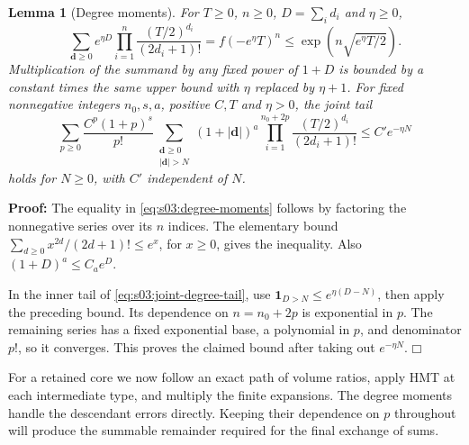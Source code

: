 \documentclass[a4paper,10pt]{article}
\numberwithin{equation}{section}
\theoremstyle{paperplain}
\newtheorem{lmm}[thm]{Lemma}
\theoremstyle{paperremark}
\theoremstyle{paperplain}
\newenvironment{prf}{\noindent \textbf{Proof: }}{\hfill $\mdlgwhtsquare$\par\addvspace{0.5\baselineskip}}
\begin{document}
\begin{lmm}[Degree moments]
\label{lmm:s03:degree-moments}
For $T\geq0$, $n\geq0$, $D=\sum_i d_i$ and $\eta\geq0$,
\begin{equation}
\label{eq:s03:degree-moments}
\sum_{\mathbf d\geq0}e^{\eta D}
 \prod_{i=1}^n\frac{(T/2)^{d_i}}{(2d_i+1)!}
=f(-e^\eta T)^n
\leq\exp\left(n\sqrt{e^\eta T/2}\right).
\end{equation}
Multiplication of the summand by any fixed power of $1+D$ is
bounded by a constant times the same upper bound with $\eta$
replaced by $\eta+1$.
For fixed nonnegative integers $n_0,s,a$, positive $C,T$ and
$\eta>0$, the joint tail
\begin{equation}
\label{eq:s03:joint-degree-tail}
\sum_{p\geq0}\frac{C^p(1+p)^s}{p!}
 \sum_{\substack{\mathbf d\geq0\\|\mathbf d|>N}}
 (1+|\mathbf d|)^a
 \prod_{i=1}^{n_0+2p}\frac{(T/2)^{d_i}}{(2d_i+1)!}
\leq C' e^{-\eta N}
\end{equation}
holds for $N\geq0$, with $C'$ independent of $N$.
\end{lmm}
\begin{prf}
The equality in \eqref{eq:s03:degree-moments} follows by factoring
the nonnegative series over its $n$ indices. The elementary bound
$\sum_{d\geq0}x^{2d}/(2d+1)!\leq e^x$, for $x\geq0$, gives the
inequality. Also $(1+D)^a\leq C_a e^D$.

In the inner tail of \eqref{eq:s03:joint-degree-tail}, use
$\mathbf1_{D>N}\leq e^{\eta(D-N)}$, then apply the preceding
bound. Its dependence on $n=n_0+2p$ is exponential in $p$.
The remaining series has a fixed exponential base, a polynomial
in $p$, and denominator $p!$, so it converges. This proves the
claimed bound after taking out $e^{-\eta N}$.
\end{prf}

For a retained core we now follow an exact path of volume ratios,
apply HMT at each intermediate type, and multiply the finite
expansions. The degree moments handle the descendant errors directly.
Keeping their dependence on $p$ throughout will produce the summable
remainder required for the final exchange of sums.
\end{document}
